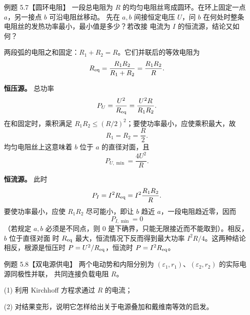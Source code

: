 \begin{origexamplebox}{例题 5.7【圆环电阻】}
一段总电阻为 $R$ 的均匀电阻丝弯成圆环。在环上固定一点 $a$，另一接点 $b$ 可沿电阻丝移动。
先在 $a,b$ 间接恒定电压 $U$，问 $b$ 在何处时整条电阻丝的发热功率最小，最小值是多少？若改接
电流为 $I$ 的恒流源，结论又如何？
\emRingResistorQuestion
{}\label{fig:em-source-thirty-sixth-section-7}
\end{origexamplebox}

\ringResistorFigure
{}

\begin{xesolution}
两段弧的电阻之和固定：$R_1+R_2=R$。它们并联后的等效电阻为
\[
  R_{\rm eq}=\frac{R_1R_2}{R_1+R_2}=\frac{R_1R_2}{R}.
\]

\textbf{恒压源。} 总功率
\[
  P_U=\frac{U^2}{R_{\rm eq}}=\frac{U^2R}{R_1R_2}.
\]
在和固定时，乘积满足 $R_1R_2\le(R/2)^2$；要使功率最小，应使乘积最大，故
\[
  R_1=R_2=\frac R2.
\]
均匀电阻丝上这意味着 $b$ 位于 $a$ 的直径对面，且
\[
  \boxed{P_{U,\min}=\frac{4U^2}{R}}.
\]

\textbf{恒流源。} 此时
\[
  P_I=I^2R_{\rm eq}=I^2\frac{R_1R_2}{R}.
\]
要使功率最小，应使 $R_1R_2$ 尽可能小，即让 $b$ 趋近 $a$，一段电阻趋近零，因而
\[
  \boxed{P_{I,\min}=0}
\]
（若规定 $a,b$ 必须是不同点，则 $0$ 是下确界，只能无限接近而不能取到）。相反，$b$ 位于直径对面
时 $R_{\rm eq}$ 最大，恒流情况下反而得到最大功率 $I^2R/4$。这两种结论相反，根源是恒压时
$P=U^2/R_{\rm eq}$，恒流时 $P=I^2R_{\rm eq}$。
\end{xesolution}

\begin{origexamplebox}{例题 5.8【双电源供电】}
两个电动势和内阻分别为 $(\varepsilon_1,r_1)$、$(\varepsilon_2,r_2)$ 的实际电源同极性并联，
共同连接负载电阻 $R$。

(1) 利用 Kirchhoff 方程求通过 $R$ 的电流；

(2) 对结果变形，说明它怎样给出关于电源叠加和戴维南等效的启发。
\dualSourceFigure
{}
\end{origexamplebox}



